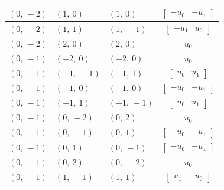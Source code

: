 \documentclass[11pt]{article}
\theoremstyle{definition}
\begin{document}
\begin{longtable}{|l|l|l|c|}
    \hline
    $\left( 0, \  -2\right)$ & $\left( 1, \  0\right)$ & $\left( 1, \  0\right)$ & $\left[\begin{matrix}- u_{0} & - u_{1}\end{matrix}\right]$ \\
    \hline
    $\left( 0, \  -2\right)$ & $\left( 1, \  1\right)$ & $\left( 1, \  -1\right)$ & $\left[\begin{matrix}- u_{1} & u_{0}\end{matrix}\right]$ \\
    \hline
    $\left( 0, \  -2\right)$ & $\left( 2, \  0\right)$ & $\left( 2, \  0\right)$ & $u_{0}$ \\
    \hline
    $\left( 0, \  -1\right)$ & $\left( -2, \  0\right)$ & $\left( -2, \  0\right)$ & $u_{0}$ \\
    \hline
    $\left( 0, \  -1\right)$ & $\left( -1, \  -1\right)$ & $\left( -1, \  1\right)$ & $\left[\begin{matrix}u_{0} & u_{1}\end{matrix}\right]$ \\
    \hline
    $\left( 0, \  -1\right)$ & $\left( -1, \  0\right)$ & $\left( -1, \  0\right)$ & $\left[\begin{matrix}- u_{0} & - u_{1}\end{matrix}\right]$ \\
    \hline
    $\left( 0, \  -1\right)$ & $\left( -1, \  1\right)$ & $\left( -1, \  -1\right)$ & $\left[\begin{matrix}u_{0} & u_{1}\end{matrix}\right]$ \\
    \hline
    $\left( 0, \  -1\right)$ & $\left( 0, \  -2\right)$ & $\left( 0, \  2\right)$ & $u_{0}$ \\
    \hline
    $\left( 0, \  -1\right)$ & $\left( 0, \  -1\right)$ & $\left( 0, \  1\right)$ & $\left[\begin{matrix}- u_{0} & - u_{1}\end{matrix}\right]$ \\
    \hline
    $\left( 0, \  -1\right)$ & $\left( 0, \  1\right)$ & $\left( 0, \  -1\right)$ & $\left[\begin{matrix}- u_{0} & - u_{1}\end{matrix}\right]$ \\
    \hline
    $\left( 0, \  -1\right)$ & $\left( 0, \  2\right)$ & $\left( 0, \  -2\right)$ & $u_{0}$ \\
    \hline
    $\left( 0, \  -1\right)$ & $\left( 1, \  -1\right)$ & $\left( 1, \  1\right)$ & $\left[\begin{matrix}u_{1} & - u_{0}\end{matrix}\right]$ \\

\end{longtable}
\end{document}
